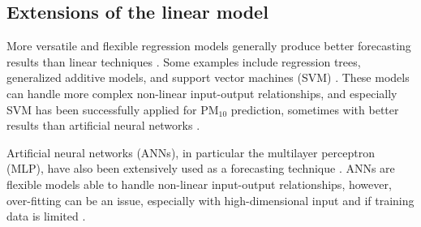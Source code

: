 

\subsection{Extensions of the linear model}
More versatile and flexible regression models generally produce better forecasting results than linear techniques \cite{atmos7020015}. Some examples include regression trees, generalized additive models, and support vector machines (SVM) \cite{atmos7020015, FaganeliPucer2018}. These models can handle more complex non-linear input-output relationships, and especially SVM has been successfully applied for PM$_{10}$ prediction, sometimes with better results than artificial neural networks \cite{atmos7020015}. 

Artificial neural networks (ANNs), in particular the multilayer perceptron (MLP), have also been extensively used as a forecasting technique \cite{atmos7020015}. ANNs are flexible models able to handle non-linear input-output relationships, however, over-fitting can be an issue, especially with high-dimensional input and if training data is limited \cite{atmos7020015, FaganeliPucer2018}. 

